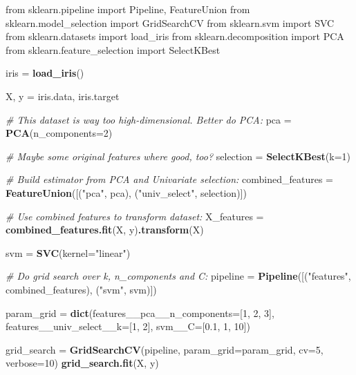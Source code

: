 \documentclass[]{scrbook}
\newenvironment{Shaded}{\begin{snugshade}}{\end{snugshade}}
\newcommand{\CommentTok}[1]{\textcolor[rgb]{0.56,0.35,0.01}{\textit{#1}}}
\newcommand{\DataTypeTok}[1]{\textcolor[rgb]{0.13,0.29,0.53}{#1}}
\newcommand{\DecValTok}[1]{\textcolor[rgb]{0.00,0.00,0.81}{#1}}
\newcommand{\FloatTok}[1]{\textcolor[rgb]{0.00,0.00,0.81}{#1}}
\newcommand{\KeywordTok}[1]{\textcolor[rgb]{0.13,0.29,0.53}{\textbf{#1}}}
\newcommand{\NormalTok}[1]{#1}
\newcommand{\StringTok}[1]{\textcolor[rgb]{0.31,0.60,0.02}{#1}}
\renewenvironment{Shaded} {\begin{snugshade}\small} {\end{snugshade}}
\begin{document}
\begin{Shaded}
\begin{Highlighting}[]
\NormalTok{from sklearn.pipeline import Pipeline, FeatureUnion}
\NormalTok{from sklearn.model_selection import GridSearchCV}
\NormalTok{from sklearn.svm import SVC}
\NormalTok{from sklearn.datasets import load_iris}
\NormalTok{from sklearn.decomposition import PCA}
\NormalTok{from sklearn.feature_selection import SelectKBest}

\NormalTok{iris =}\StringTok{ }\KeywordTok{load_iris}\NormalTok{()}

\NormalTok{X, y =}\StringTok{ }\NormalTok{iris.data, iris.target}

\CommentTok{# This dataset is way too high-dimensional. Better do PCA:}
\NormalTok{pca =}\StringTok{ }\KeywordTok{PCA}\NormalTok{(}\DataTypeTok{n_components=}\DecValTok{2}\NormalTok{)}

\CommentTok{# Maybe some original features where good, too?}
\NormalTok{selection =}\StringTok{ }\KeywordTok{SelectKBest}\NormalTok{(}\DataTypeTok{k=}\DecValTok{1}\NormalTok{)}

\CommentTok{# Build estimator from PCA and Univariate selection:}
\NormalTok{combined_features =}\StringTok{ }\KeywordTok{FeatureUnion}\NormalTok{([(}\StringTok{"pca"}\NormalTok{, pca), (}\StringTok{"univ_select"}\NormalTok{, selection)])}

\CommentTok{# Use combined features to transform dataset:}
\NormalTok{X_features =}\StringTok{ }\KeywordTok{combined_features.fit}\NormalTok{(X, y)}\KeywordTok{.transform}\NormalTok{(X)}

\NormalTok{svm =}\StringTok{ }\KeywordTok{SVC}\NormalTok{(}\DataTypeTok{kernel=}\StringTok{"linear"}\NormalTok{)}

\CommentTok{# Do grid search over k, n_components and C:}
\NormalTok{pipeline =}\StringTok{ }\KeywordTok{Pipeline}\NormalTok{([(}\StringTok{"features"}\NormalTok{, combined_features), (}\StringTok{"svm"}\NormalTok{, svm)])}

\NormalTok{param_grid =}\StringTok{ }\KeywordTok{dict}\NormalTok{(}\DataTypeTok{features__pca__n_components=}\NormalTok{[}\DecValTok{1}\NormalTok{, }\DecValTok{2}\NormalTok{, }\DecValTok{3}\NormalTok{],}
                  \DataTypeTok{features__univ_select__k=}\NormalTok{[}\DecValTok{1}\NormalTok{, }\DecValTok{2}\NormalTok{],}
                  \DataTypeTok{svm__C=}\NormalTok{[}\FloatTok{0.1}\NormalTok{, }\DecValTok{1}\NormalTok{, }\DecValTok{10}\NormalTok{])}

\NormalTok{grid_search =}\StringTok{ }\KeywordTok{GridSearchCV}\NormalTok{(pipeline, }\DataTypeTok{param_grid=}\NormalTok{param_grid, }\DataTypeTok{cv=}\DecValTok{5}\NormalTok{, }\DataTypeTok{verbose=}\DecValTok{10}\NormalTok{)}
\KeywordTok{grid_search.fit}\NormalTok{(X, y)}
\end{Highlighting}
\end{Shaded}
\end{document}
